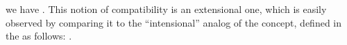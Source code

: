 \documentclass[a4paper,USenglish,cleveref,autoref,thm-restate]{lipics-v2019}
\begin{document}
\AgdaSpace{}%
\AgdaSpace{}%
\AgdaSpace{}%
we have 
\AgdaSpace{}%
\AgdaSymbol{((}\AgdaSpace{}%
\AgdaSpace{}%
\AgdaSymbol{)}\AgdaSpace{}%
\AgdaSymbol{)}\AgdaSpace{}%
\AgdaSpace{}%
\AgdaSymbol{(}\AgdaSpace{}%
\AgdaSpace{}%
\AgdaSymbol{)}\AgdaSpace{}%
\AgdaSymbol{(}\AgdaSpace{}%
\AgdaSpace{}%
\AgdaSymbol{)}. This notion of compatibility is an extensional one, which is easily observed by comparing it to the ``intensional'' analog of the concept, defined in the \agdaualib as follows:
\AgdaSpace{}%
\AgdaSpace{}%
\AgdaSpace{}%
\AgdaSpace{}%
\AgdaSymbol{((}\AgdaSpace{}%
\AgdaSpace{}%
\AgdaSymbol{)}\AgdaSpace{}%
\AgdaSymbol{))}\AgdaSpace{}%
\AgdaSpace{}%
\AgdaSpace{}%
\AgdaSpace{}%
\AgdaSpace{}%
\AgdaSymbol{(}\AgdaSpace{}%
\AgdaSpace{}%
\AgdaSymbol{)(}\AgdaSpace{}%
\AgdaSpace{}%
\AgdaSymbol{))}.
\end{document}

